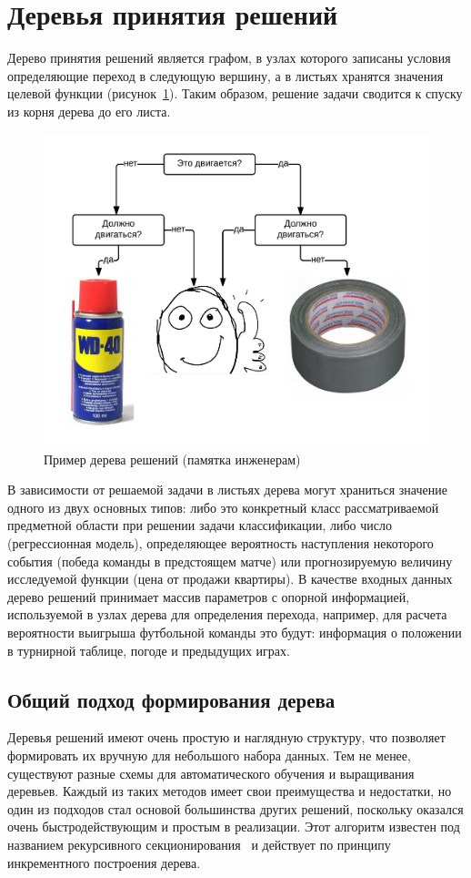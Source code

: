 \documentclass[a4paper,14pt]{extarticle} %
\begin{document}
\section{Деревья принятия решений} 
\hspace{\parindent} Дерево принятия решений является графом, в узлах которого записаны условия определяющие переход в следующую вершину, а в листьях хранятся значения целевой функции (рисунок~\ref{fig:decision-tree}). Таким образом, решение задачи сводится к спуску из корня дерева до его листа.

\begin{figure}[H]
\centering
\includegraphics[width=0.85\linewidth]{decision-tree}
\caption{Пример дерева решений (памятка инженерам)}
\label{fig:decision-tree}
\end{figure}

В зависимости от решаемой задачи в листьях дерева могут храниться значение одного из двух основных типов: либо это конкретный класс рассматриваемой предметной области при решении задачи классификации, либо число (регрессионная модель), определяющее вероятность наступления некоторого события (победа команды в предстоящем матче) или прогнозируемую величину исследуемой функции (цена от продажи квартиры). В качестве входных данных дерево решений принимает массив параметров с опорной информацией, используемой в узлах дерева для определения перехода, например, для расчета вероятности выигрыша футбольной команды это будут: информация о положении в турнирной таблице, погоде и предыдущих играх.

\subsection{Общий подход формирования дерева}
\hspace{\parindent} Деревья решений имеют очень простую и наглядную структуру, что позволяет формировать их вручную для небольшого набора данных. Тем не менее, существуют разные схемы для автоматического обучения и выращивания деревьев. Каждый из таких методов имеет свои преимущества и недостатки, но один из подходов стал основой большинства других решений, поскольку оказался очень быстродействующим и простым в реализации. Этот алгоритм известен под названием рекурсивного секционирования~\cite{quinlan1990decision} и действует по принципу инкрементного построения дерева.
\end{document}
